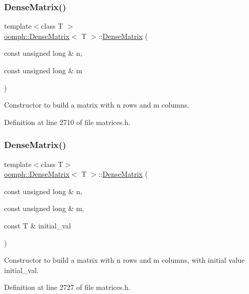 \subsubsection{\texorpdfstring{Dense\+Matrix()}{DenseMatrix()}\hspace{0.1cm}{\footnotesize\ttfamily [4/5]}}
{\footnotesize\ttfamily template$<$class T $>$ \\
\hyperlink{classoomph_1_1DenseMatrix}{oomph\+::\+Dense\+Matrix}$<$ T $>$\+::\hyperlink{classoomph_1_1DenseMatrix}{Dense\+Matrix} (\begin{DoxyParamCaption}\item[{const unsigned long \&}]{n,  }\item[{const unsigned long \&}]{m }\end{DoxyParamCaption})}



Constructor to build a matrix with n rows and m columns. 



Definition at line 2710 of file matrices.\+h.

\mbox{\label{classoomph_1_1DenseMatrix_a7b599610bd78a7818b2e4d0835b27e3a}} 
\subsubsection{\texorpdfstring{Dense\+Matrix()}{DenseMatrix()}\hspace{0.1cm}{\footnotesize\ttfamily [5/5]}}
{\footnotesize\ttfamily template$<$class T$>$ \\
\hyperlink{classoomph_1_1DenseMatrix}{oomph\+::\+Dense\+Matrix}$<$ T $>$\+::\hyperlink{classoomph_1_1DenseMatrix}{Dense\+Matrix} (\begin{DoxyParamCaption}\item[{const unsigned long \&}]{n,  }\item[{const unsigned long \&}]{m,  }\item[{const T \&}]{initial\+\_\+val }\end{DoxyParamCaption})}



Constructor to build a matrix with n rows and m columns, with initial value initial\+\_\+val. 



Definition at line 2727 of file matrices.\+h.

